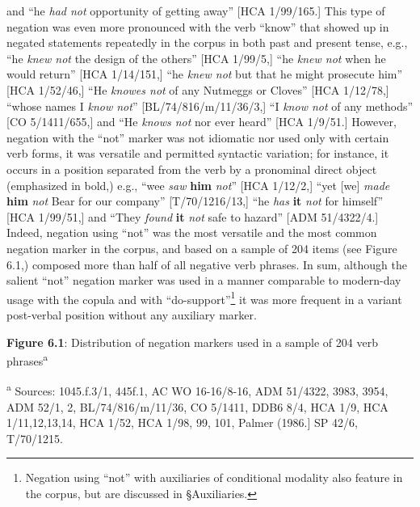 \begin{styleStandard}
[HCA 1/9/4,] and “he \textit{had not} opportunity of getting away” [HCA 1/99/165.] This type of negation was even more pronounced with the verb “know” that showed up in negated statements repeatedly in the corpus in both past and present tense, e.g., “he \textit{knew not} the design of the others” [HCA 1/99/5,] “he \textit{knew not} when he would return” [HCA 1/14/151,] “he \textit{knew not} but that he might prosecute him” [HCA 1/52/46,] “He \textit{knowes not} of any Nutmeggs or Cloves” [HCA 1/12/78,] “whose names I \textit{know not}” [BL/74/816/m/11/36/3,] “I \textit{know not} of any methods” [CO 5/1411/655,] and “He \textit{knows not} nor ever heard” [HCA 1/9/51.] However, negation with the “not” marker was not idiomatic nor used only with certain verb forms, it was versatile and permitted syntactic variation; for instance, it occurs in a position separated from the verb by a pronominal direct object (emphasized in bold,) e.g., “wee \textit{saw}\textbf{\textit{ }}\textbf{him} \textit{not}” [HCA 1/12/2,] “yet [we] \textit{made }\textbf{him} \textit{not} Bear for our company” [T/70/1216/13,] “he \textit{has}\textbf{ it} \textit{not} for himself” [HCA 1/99/51,] and “They \textit{found}\textbf{ it} \textit{not} safe to hazard” [ADM 51/4322/4.] Indeed, negation using “not” was the most versatile and the most common negation marker in the corpus, and based on a sample of 204 items (see Figure 6.1,) composed more than half of all negative verb phrases. In sum, although the salient “not” negation marker was used in a manner comparable to modern-day usage with the copula and with “do-support”\footnote{ Negation using “not” with auxiliaries of conditional modality also feature in the corpus, but are discussed in §Auxiliaries.} it was more frequent in a variant post-verbal position without any auxiliary marker.
\end{styleStandard}


\begin{styleStandard}
\end{styleStandard}

\begin{styleStandard}
\textbf{Figure 6.1}: Distribution of negation markers used in a sample of 204 verb phrases\textsuperscript{a }
\end{styleStandard}

\begin{styleStandard}
\textsuperscript{a} Sources: 1045.f.3/1, 445f.1, AC WO 16-16/8-16, ADM 51/4322, 3983, 3954, ADM 52/1, 2, BL/74/816/m/11/36, CO 5/1411, DDB6 8/4, HCA 1/9, HCA 1/11,12,13,14, HCA 1/52, HCA 1/98, 99, 101, Palmer (1986.] SP 42/6, T/70/1215.
\end{styleStandard}


